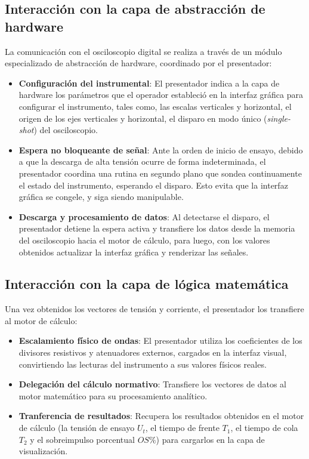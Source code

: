 \subsection{Interacción con la capa de abstracción de hardware}
La comunicación con el osciloscopio digital se realiza a través de un módulo especializado de abstracción de hardware, coordinado por el presentador:
\begin{itemize}
    \item \textbf{Configuración del instrumental}: El presentador indica a la capa de hardware los parámetros que el operador estableció en la interfaz gráfica para configurar el instrumento, tales como, las escalas verticales y horizontal, el origen de los ejes verticales y horizontal, el disparo en modo único (\emph{single-shot}) del osciloscopio.
    \item \textbf{Espera no bloqueante de señal}: Ante la orden de inicio de ensayo, debido a que la descarga de alta tensión ocurre de forma indeterminada, el presentador coordina una rutina en segundo plano que sondea continuamente el estado del instrumento, esperando el disparo. Esto evita que la interfaz gráfica se congele, y siga siendo manipulable.
    \item \textbf{Descarga y procesamiento de datos}: Al detectarse el disparo, el presentador detiene la espera activa y transfiere los datos desde la memoria del osciloscopio hacia el motor de cálculo, para luego, con los valores obtenidos actualizar la interfaz gráfica y renderizar las señales.
\end{itemize}

\subsection{Interacción con la capa de lógica matemática}
Una vez obtenidos los vectores de tensión y corriente, el presentador los transfiere al motor de cálculo:
\begin{itemize}
    \item \textbf{Escalamiento físico de ondas}: El presentador utiliza los coeficientes de los divisores resistivos y atenuadores externos, cargados en la interfaz visual, convirtiendo las lecturas del instrumento a sus valores físicos reales.
    \item \textbf{Delegación del cálculo normativo}: Transfiere los vectores de datos al motor matemático para su procesamiento analítico.
    \item \textbf{Tranferencia de resultados}: Recupera los resultados obtenidos en el motor de cálculo (la tensión de ensayo $U_t$, el tiempo de frente $T_1$, el tiempo de cola $T_2$ y el sobreimpulso porcentual $OS\%$) para cargarlos en la capa de visualización.
\end{itemize}

